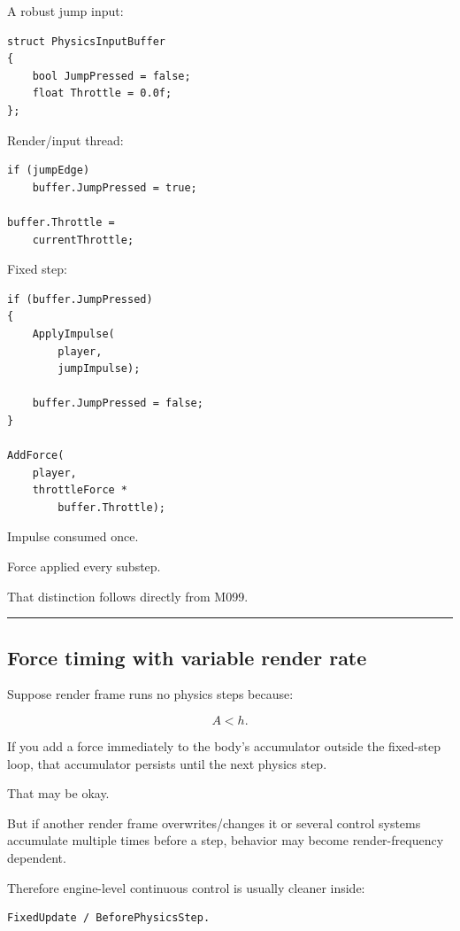 A robust jump input:

\begin{verbatim}
struct PhysicsInputBuffer
{
    bool JumpPressed = false;
    float Throttle = 0.0f;
};
\end{verbatim}

Render/input thread:

\begin{verbatim}
if (jumpEdge)
    buffer.JumpPressed = true;

buffer.Throttle =
    currentThrottle;
\end{verbatim}

Fixed step:

\begin{verbatim}
if (buffer.JumpPressed)
{
    ApplyImpulse(
        player,
        jumpImpulse);

    buffer.JumpPressed = false;
}

AddForce(
    player,
    throttleForce *
        buffer.Throttle);
\end{verbatim}

Impulse consumed once.

Force applied every substep.

That distinction follows directly from M099.

\begin{center}\rule{0.5\linewidth}{0.5pt}\end{center}

\subsection{Force timing with variable render rate}\label{06-engine-ii-ch038-force-timing-with-variable-render-rate}

Suppose render frame runs no physics steps because:

\[
A<h.
\]

If you add a force immediately to the body's accumulator outside the fixed-step loop, that accumulator persists until the next physics step.

That may be okay.

But if another render frame overwrites/changes it or several control systems accumulate multiple times before a step, behavior may become render-frequency dependent.

Therefore engine-level continuous control is usually cleaner inside:

\begin{verbatim}
FixedUpdate / BeforePhysicsStep.
\end{verbatim}

